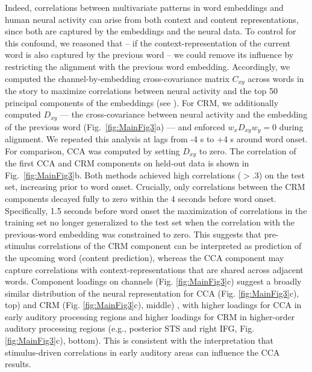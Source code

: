 \documentclass{article}
\begin{document}
Indeed, correlations between multivariate patterns in word embeddings and human neural activity can arise from both context and content representations, since both are captured by the embeddings and the neural data. To control for this confound, we reasoned that -- if the context-representation of the current word is also captured by the previous word -- we could remove its influence by restricting the alignment with the previous word embedding. Accordingly, we computed the channel-by-embedding cross-covariance matrix $C_{xy}$ across words in the story to maximize correlations between neural activity and the top 50 principal components of the embeddings (see ). For CRM, we additionally computed $D_{xy}$ — the cross‑covariance between neural activity and the embedding of the previous word (Fig.~\ref{fig:MainFig3}a) — and enforced $w_x D_{xy} w_y = 0$ during alignment. We repeated this analysis at lags from -4 s to +4 s around word onset. For comparison, CCA was computed by setting $D_{xy}$ to zero. The correlation of the first CCA and CRM components on held‑out data is shown in Fig.~\ref{fig:MainFig3}b. Both methods achieved high correlations ($>.3$) on the test set, increasing prior to word onset. Crucially, only correlations between the CRM components decayed fully to zero within the 4 seconds before word onset. Specifically, 1.5 seconds before word onset the maximization of correlations in the training set no longer generalized to the test set when the correlation with the previous‑word embedding was constrained to zero. This suggests that pre-stimulus correlations of the CRM component can be interpreted as prediction of the upcoming word (content prediction), whereas the CCA component may capture correlations with context-representations that are shared across adjacent words. Component loadings on channels (Fig. \ref{fig:MainFig3}c) suggest a broadly similar distribution of the neural representation for CCA (Fig. \ref{fig:MainFig3}c), top) and CRM (Fig. \ref{fig:MainFig3}c), middle) , with higher loadings for CCA in early auditory processing regions and higher loadings for CRM in higher-order auditory processing regions (e.g., posterior STS and right IFG, Fig. \ref{fig:MainFig3}c), bottom). This is consistent with the interpretation that stimulus-driven correlations in early auditory areas can influence the CCA results.
\end{document}
